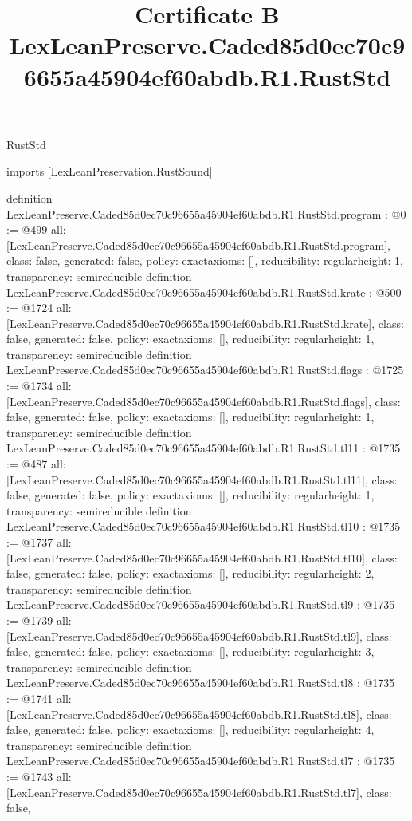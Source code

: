 \begin{lexlean}{RustStd}
\title{Certificate B LexLeanPreserve.Caded85d0ec70c96655a45904ef60abdb.R1.RustStd}
\begin{coremodule}
imports [LexLeanPreservation.RustSound]

definition LexLeanPreserve.Caded85d0ec70c96655a45904ef60abdb.R1.RustStd.program : @0 := @499 {
  all: [LexLeanPreserve.Caded85d0ec70c96655a45904ef60abdb.R1.RustStd.program],
  class: false,
  generated: false,
  policy: exact{axioms: []},
  reducibility: regular{height: 1},
  transparency: semireducible
}
definition LexLeanPreserve.Caded85d0ec70c96655a45904ef60abdb.R1.RustStd.krate : @500 := @1724 {
  all: [LexLeanPreserve.Caded85d0ec70c96655a45904ef60abdb.R1.RustStd.krate],
  class: false,
  generated: false,
  policy: exact{axioms: []},
  reducibility: regular{height: 1},
  transparency: semireducible
}
definition LexLeanPreserve.Caded85d0ec70c96655a45904ef60abdb.R1.RustStd.flags : @1725 := @1734 {
  all: [LexLeanPreserve.Caded85d0ec70c96655a45904ef60abdb.R1.RustStd.flags],
  class: false,
  generated: false,
  policy: exact{axioms: []},
  reducibility: regular{height: 1},
  transparency: semireducible
}
definition LexLeanPreserve.Caded85d0ec70c96655a45904ef60abdb.R1.RustStd.tl11 : @1735 := @487 {
  all: [LexLeanPreserve.Caded85d0ec70c96655a45904ef60abdb.R1.RustStd.tl11],
  class: false,
  generated: false,
  policy: exact{axioms: []},
  reducibility: regular{height: 1},
  transparency: semireducible
}
definition LexLeanPreserve.Caded85d0ec70c96655a45904ef60abdb.R1.RustStd.tl10 : @1735 := @1737 {
  all: [LexLeanPreserve.Caded85d0ec70c96655a45904ef60abdb.R1.RustStd.tl10],
  class: false,
  generated: false,
  policy: exact{axioms: []},
  reducibility: regular{height: 2},
  transparency: semireducible
}
definition LexLeanPreserve.Caded85d0ec70c96655a45904ef60abdb.R1.RustStd.tl9 : @1735 := @1739 {
  all: [LexLeanPreserve.Caded85d0ec70c96655a45904ef60abdb.R1.RustStd.tl9],
  class: false,
  generated: false,
  policy: exact{axioms: []},
  reducibility: regular{height: 3},
  transparency: semireducible
}
definition LexLeanPreserve.Caded85d0ec70c96655a45904ef60abdb.R1.RustStd.tl8 : @1735 := @1741 {
  all: [LexLeanPreserve.Caded85d0ec70c96655a45904ef60abdb.R1.RustStd.tl8],
  class: false,
  generated: false,
  policy: exact{axioms: []},
  reducibility: regular{height: 4},
  transparency: semireducible
}
definition LexLeanPreserve.Caded85d0ec70c96655a45904ef60abdb.R1.RustStd.tl7 : @1735 := @1743 {
  all: [LexLeanPreserve.Caded85d0ec70c96655a45904ef60abdb.R1.RustStd.tl7],
  class: false,
}
\end{coremodule}
\end{lexlean}
